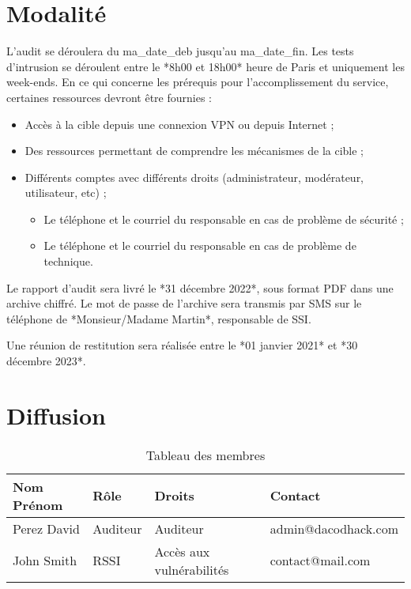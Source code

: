 \documentclass[12pt]{extarticle}
\begin{document}
\section{Modalité}
    L’audit se déroulera du ma_date_deb jusqu’au ma_date_fin. Les tests d’intrusion se déroulent entre le *8h00 et 18h00* heure de Paris et uniquement les week-ends.
    En ce qui concerne les prérequis pour l’accomplissement du service, certaines ressources devront être fournies :
    \begin{itemize}
        \item Accès à la cible depuis  une connexion VPN ou depuis Internet ;
        \item Des ressources permettant de comprendre les mécanismes de la cible ;
        \item Différents comptes avec différents droits (administrateur, modérateur, utilisateur, etc) ;

        \begin{itemize}
            \item Le téléphone et le courriel du responsable en cas de problème de sécurité ;
            \item Le téléphone et le courriel du responsable en cas de problème de technique.

        \end{itemize}

    \end{itemize}
    Le rapport d’audit sera livré le *31 décembre 2022*, sous format PDF dans une archive chiffré. Le mot de passe de l’archive sera transmis par SMS sur le téléphone de *Monsieur/Madame Martin*, responsable de SSI.

    Une réunion de restitution sera réalisée entre le *01 janvier 2021* et  *30 décembre 2023*.

\section{Diffusion}
    \begin{table}[h]
        \centering
        \caption{Tableau des membres}
        \begin{tabular}{|l|l|l|l|}
            \hline
            \textbf{Nom Prénom} & \textbf{Rôle} & \textbf{Droits} & \textbf{Contact} \\
            \hline
            Perez David         & Auditeur      & Auditeur        & admin@dacodhack.com \\
            \hline
            John Smith          & RSSI          & Accès aux vulnérabilités & contact@mail.com \\
            \hline
        \end{tabular}
        \label{tab:membres}
    \end{table}
\end{document}
